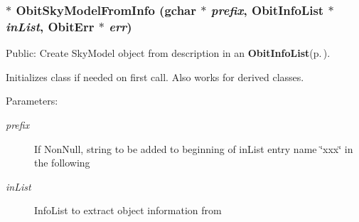\subsubsection{$\ast$ Obit\-Sky\-Model\-From\-Info (gchar $\ast$ {\em prefix}, {\bf Obit\-Info\-List} $\ast$ {\em in\-List}, {\bf Obit\-Err} $\ast$ {\em err})}\label{ObitSkyModel_8c_a14}


Public: Create Sky\-Model object from description in an {\bf Obit\-Info\-List}{\rm (p.\,\pageref{structObitInfoList})}. 

Initializes class if needed on first call. Also works for derived classes. \begin{Desc}
\item[Parameters:]
\begin{description}
\item[{\em prefix}]If Non\-Null, string to be added to beginning of in\-List entry name \char`\"{}xxx\char`\"{} in the following \item[{\em in\-List}]Info\-List to extract object information from \begin{itemize}

\end{itemize}
\end{description}
\end{Desc}

